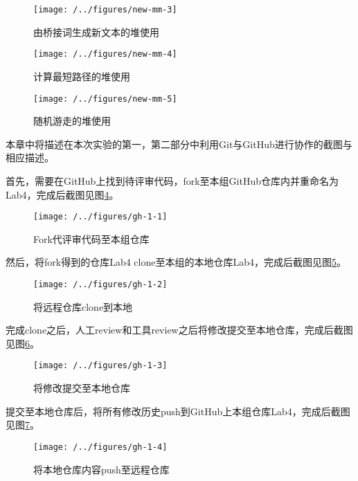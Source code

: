 \begin{figure}
\centering
\texttt{[image: /../figures/new-mm-3]}
\caption{由桥接词生成新文本的堆使用}
\label{fig:new-mm-3}
\end{figure}

\begin{figure}
\centering
\texttt{[image: /../figures/new-mm-4]}
\caption{计算最短路径的堆使用}
\label{fig:new-mm-4}
\end{figure}

\begin{figure}
\centering
\texttt{[image: /../figures/new-mm-5]}
\caption{随机游走的堆使用}
\label{fig:new-mm-5}
\end{figure}

本章中将描述在本次实验的第一，第二部分中利用Git与GitHub进行协作的截图与相应描述。

首先，需要在GitHub上找到待评审代码，fork至本组GitHub仓库内并重命名为Lab4，完成后截图见图\ref{fig:gh-1-1}。

\begin{figure}
\centering
\texttt{[image: /../figures/gh-1-1]}
\caption{Fork代评审代码至本组仓库}
\label{fig:gh-1-1}
\end{figure}

然后，将fork得到的仓库Lab4 clone至本组的本地仓库Lab4，完成后截图见图\ref{fig:gh-1-2}。

\begin{figure}
\centering
\texttt{[image: /../figures/gh-1-2]}
\caption{将远程仓库clone到本地}
\label{fig:gh-1-2}
\end{figure}

完成clone之后，人工review和工具review之后将修改提交至本地仓库，完成后截图见图\ref{fig:gh-1-3}。

\begin{figure}
\centering
\texttt{[image: /../figures/gh-1-3]}
\caption{将修改提交至本地仓库}
\label{fig:gh-1-3}
\end{figure}

提交至本地仓库后，将所有修改历史push到GitHub上本组仓库Lab4，完成后截图见图\ref{fig:gh-1-4}。

\begin{figure}
\centering
\texttt{[image: /../figures/gh-1-4]}
\caption{将本地仓库内容push至远程仓库}
\label{fig:gh-1-4}
\end{figure}

